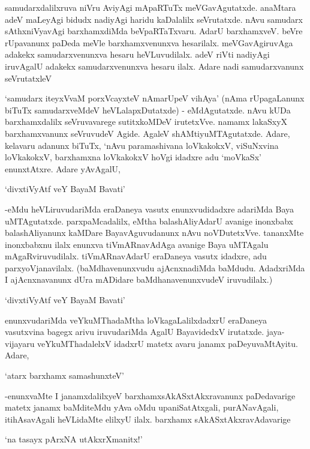 samudarxdalilxruva niVru AviyAgi mApaRTuTx meVGavAgutatxde. anaMtara adeV maLeyAgi bidudx nadiyAgi haridu kaDalalilx seVrutatxde. nAvu samudarx sAthxniVyavAgi barxhamxdiMda beVpaRTaTxvaru. AdarU barxhamxveV. beVre rUpavanunx paDeda meVle barxhamxvenunxva hesarilalx. meVGavAgiruvAga adakekx samudarxvenunxva hesaru heVLuvudilalx. adeV riVti nadiyAgi iruvAgalU adakekx samudarxvenunxva hesaru ilalx. Adare nadi samudarxvanunx seVrutatxleV 

`samudarx iteyxVvaM porxVcayxteV nAmarUpeV vihAya' (nAma rUpagaLanunx biTuTx samudarxveMdeV heVLalapxDutatxde) - eMdAgutatxde. nAvu kUDa barxhamxdalilx seVruvavarege sutitxkoMDeV irutetxVve. namamx lakaSxyX  barxhamxvanunx seVruvudeV Agide. AgaleV shAMtiyuMTAgutatxde. Adare, kelavaru adanunx biTuTx, `nAvu paramashivana loVkakokxV, viSuNxvina loVkakokxV, barxhamxna loVkakokxV hoVgi idadxre adu `moVkaSx' enunxtAtxre. Adare yAvAgalU, 

\begin{shloka}
`divxtiVyAtf veY BayaM Bavati'
\end{shloka}

-eMdu heVLiruvudariMda eraDaneya vasutx enunxvudidadxre adariMda Baya uMTAgutatxde. parxpaMcadalilx, eMtha balashAliyAdarU avanige inonxbabx balashAliyanunx kaMDare BayavAguvudanunx nAvu noVDutetxVve. tananxMte inonxbabxnu ilalx enunxva tiVmARnavAdAga avanige Baya uMTAgalu mAgaRviruvudilalx. tiVmARnavAdarU eraDaneya vasutx idadxre, adu parxyoVjanavilalx. (baMdhavenunxvudu ajAcnxnadiMda baMdudu. AdadxriMda I ajAcnxnavanunx dUra mADidare baMdhanavenunxvudeV iruvudilalx.)

\begin{shloka}
`divxtiVyAtf veY BayaM Bavati'
\end{shloka}

enunxvudariMda veYkuMThadaMtha loVkagaLalilxdadxrU eraDaneya vasutxvina bagegx arivu iruvudariMda AgalU BayavidedxV irutatxde. jaya-vijayaru veYkuMThadalelxV idadxrU matetx avaru janamx paDeyuvaMtAyitu. Adare,

\begin{shloka}
`atarx barxhamx samashunxteV'
\end{shloka}

-enunxvaMte I janamxdalilxyeV barxhamxsAkASxtAkxravanunx paDedavarige matetx janamx baMditeMdu yAva oMdu upaniSatAtxgali, purANavAgali, itihAsavAgali heVLidaMte elilxyU ilalx. barxhamx sAkASxtAkxravAdavarige

\begin{shloka}
`na tasayx pArxNA utAkxrXmanitx!'
\end{shloka}

